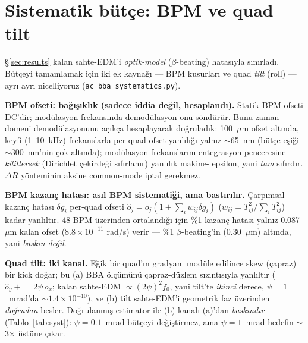 \documentclass[twocolumn,a4paper,10pt]{article}
\begin{document}
\section{Sistematik bütçe: BPM ve quad tilt}
\label{sec:systematics}
§\ref{sec:results} kalan sahte-EDM'i \emph{optik-model} ($\beta$-beating)
hatasıyla sınırladı. Bütçeyi tamamlamak için iki ek kaynağı --- BPM kusurları ve
quad \emph{tilt} (roll) --- ayrı ayrı nicelliyoruz (\texttt{ac\_bba\_systematics.py}).

\textbf{BPM ofseti: bağışıklık (sadece iddia değil, hesaplandı).} Statik BPM
ofseti DC'dir; modülasyon frekansında demodülasyon onu söndürür. Bunu zaman-domeni
demodülasyonunu açıkça hesaplayarak doğruladık: 100~$\mu$m ofset altında, keyfi
(1--10~kHz) frekanslarla per-quad ofset yanlılığı yalnız $\sim$65~nm
(bütçe eşiği $\sim$300~nm'nin çok altında); modülasyon frekanslarını entegrasyon
penceresine \emph{kilitlersek} (Dirichlet çekirdeği sıfırlanır) yanlılık makine-
epsilon, yani \emph{tam} sıfırdır. $\Delta R$ yönteminin aksine common-mode iptal
gerekmez.

\textbf{BPM kazanç hatası: asıl BPM sistematiği, ama bastırılır.} Çarpımsal kazanç
hatası $\delta g_i$ per-quad ofseti $\hat o_j = o_j(1 + \sum_i w_{ij}\delta g_i)$
($w_{ij}=T_{ij}^2/\sum_i T_{ij}^2$) kadar yanlıltır. 48 BPM üzerinden ortalandığı
için \%1 kazanç hatası yalnız 0.087~$\mu$m kalan ofset ($8.8\times10^{-11}$ rad/s)
verir --- \%1 $\beta$-beating'in (0.30~$\mu$m) altında, yani \emph{baskın değil}.

\textbf{Quad tilt: iki kanal.} Eğik bir quad'ın gradyanı modüle edilince skew
(çapraz) bir kick doğar; bu (a) BBA ölçümünü çapraz-düzlem sızıntısıyla yanlıltır
($\hat o_y \mathrel{+}= 2\psi\, o_x$; kalan sahte-EDM $\propto (2\psi)^2 f_0$, yani
tilt'te \emph{ikinci} derece, $\psi=1$~mrad'da $\sim$$1.4\times10^{-10}$), ve (b)
tilt sahte-EDM'i geometrik faz üzerinden \emph{doğrudan} besler. Doğrulanmış
estimator ile (b) kanalı (a)'dan \emph{baskındır} (Tablo~\ref{tab:syst}):
$\psi=0.1$~mrad bütçeyi değiştirmez, ama $\psi=1$~mrad hedefin $\sim$3$\times$
üstüne çıkar.
\end{document}
